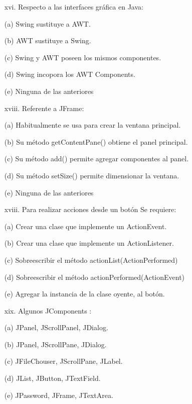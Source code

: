 \documentclass[10pt]{article}
\begin{document}
{\begin{enumerate}
\begin{multicols}{2}
    \begin{enumerate}[label=(\alph*)]
        \item[xvi.] Respecto a las interfaces gr\'afica en Java:
        \item[(a)] Swing sustituye a AWT.
        \item[(b)] AWT sustituye a Swing.
        \item[(c)] Swing y AWT poseen los mismos componentes.
        \item[(d)] Swing incopora los AWT Components.
        \item[(e)] Ninguna de las anteriores
    \end{enumerate}

    \begin{enumerate}[label=(\alph*)]
        \item[xviii.] Referente a JFrame:
        \item[(a)] Habitualmente se usa para crear la ventana principal.
        \item[(b)] Su m\'etodo getContentPane() obtiene el panel principal.
        \item[(c)] Su m\'etodo add() permite agregar componentes al panel.
        \item[(d)] Su m\'etodo setSize() permite dimensionar la ventana.
        \item[(e)] Ninguna de las anteriores
    \end{enumerate}

    \begin{enumerate}[label=(\alph*)]
        \item[xviii.] Para realizar acciones desde un bot\'on Se requiere:
        \item[(a)] Crear una clase que implemente un ActionEvent.
        \item[(b)] Crear una clase que implemente un ActionListener.
        \item[(c)] Sobreescribir el m\'etodo actionList(ActionPerformed)
        \item[(d)] Sobreescribir el m\'etodo actionPerformed(ActionEvent)
        \item[(e)] Agregar la instancia de la clase oyente, al bot\'on.
    \end{enumerate}
    
    \begin{enumerate}[label=(\alph*)]
        \item[xix.] Algunos JComponents : 
        \item[(a)] JPanel, JScrollPanel, JDialog.
        \item[(b)] JPanel, JScrollPane, JDialog.
        \item[(c)] JFileChouser, JScrollPane, JLabel.
        \item[(d)] JList, JButton, JTextField.
        \item[(e)] JPassword, JFrame, JTextArea.
    \end{enumerate}


\end{multicols}
\end{enumerate}}
\end{document}
